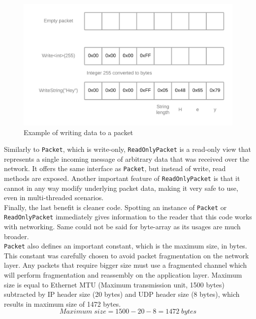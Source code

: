 \documentclass[times, utf8, diplomski]{fer}
\newcommand{\classname}[1]{\texttt{#1}}
\begin{document}
\begin{figure}[h!]
	\centering
	\includegraphics[scale=0.22]{Packet-write}
	\caption{Example of writing data to a packet}
	\label{fig:packet-write}
\end{figure}

Similarly to \classname{Packet}, which is write-only, \classname{Read\-Only\-Packet} is a read-only view that represents a single incoming message of arbitrary data that was received over the network. It offers the same interface as \classname{Packet}, but instead of write, read methods are exposed. Another important feature of \classname{Read\-Only\-Packet} is that it cannot in any way modify underlying packet data, making it very safe to use, even in multi-threaded scenarios. \\

Finally, the last benefit is cleaner code. Spotting an instance of \classname{Packet} or \classname{Read\-Only\-Packet} immediately gives information to the reader that this code works with networking. Same could not be said for byte-array as its usages are much broader. \\

\classname{Packet} also defines an important constant, which is the maximum size, in bytes. This constant was carefully chosen to avoid packet fragmentation on the network layer. Any packets that require bigger size must use a fragmented channel which will perform fragmentation and reassembly on the application layer. Maximum size is equal to Ethernet MTU (Maximum transmission unit, 1500 bytes) subtracted by IP header size (20 bytes) and UDP header size (8 bytes), which results in maximum size of 1472 bytes.\\

\begin{equation}
	Maximum \; size = 1500 - 20 - 8 = 1472 \; bytes \label{eq:max_packet_size}
\end{equation}
\end{document}
